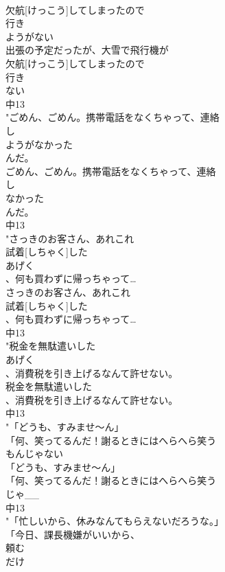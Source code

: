 \documentclass[8pt]{extreport}
\begin{document}
\begin{CJK}{UTF8}{min}
\\	欠航[けっこう]してしまったので
\\	行き
\\	ようがない
\\	出張の予定だったが、大雪で飛行機が
\\	欠航[けっこう]してしまったので
\\	行き
\\	ない
\\	中13
\\	"ごめん、ごめん。携帯電話をなくちゃって、連絡
\\	し
\\	ようがなかった
\\	んだ。
\\	ごめん、ごめん。携帯電話をなくちゃって、連絡
\\	し
\\	なかった
\\	んだ。
\\	中13
\\	"さっきのお客さん、あれこれ
\\	試着[しちゃく]した
\\	あげく
\\	、何も買わずに帰っちゃって…
\\	さっきのお客さん、あれこれ
\\	試着[しちゃく]した
\\	、何も買わずに帰っちゃって…
\\	中13
\\	"税金を無駄遣いした
\\	あげく
\\	、消費税を引き上げるなんて許せない。
\\	税金を無駄遣いした
\\	、消費税を引き上げるなんて許せない。
\\	中13
\\	"「どうも、すみませ～ん」
\\	「何、笑ってるんだ！謝るときにはへらへら笑う
\\	もんじゃない
\\	「どうも、すみませ～ん」
\\	「何、笑ってるんだ！謝るときにはへらへら笑う
\\	じゃ__
\\	中13
\\	"「忙しいから、休みなんてもらえないだろうな。」
\\	「今日、課長機嫌がいいから、
\\	頼む
\\	だけ

\end{CJK}
\end{document}
